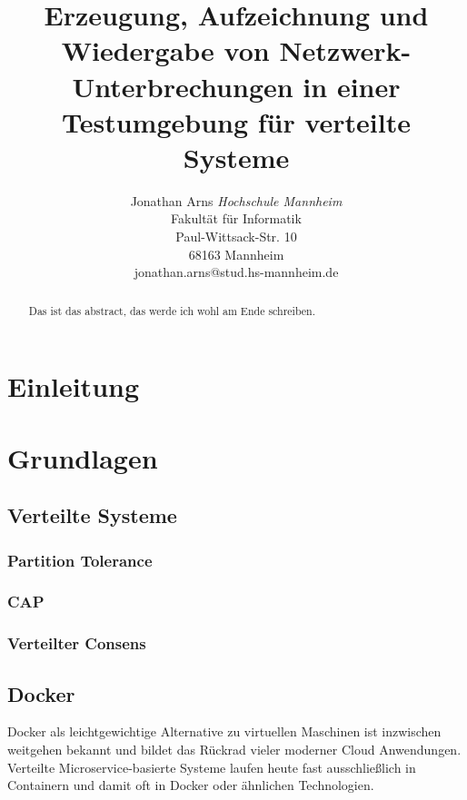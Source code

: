 \documentclass[a4paper]{report}
\begin{document}
\title{Erzeugung, Aufzeichnung und Wiedergabe von Netzwerk-Unterbrechungen in einer Testumgebung für verteilte Systeme}


\author{Jonathan Arns
	\textit{Hochschule Mannheim} \\
	Fakultät für Informatik\\
	Paul-Wittsack-Str. 10\\
	68163 Mannheim\\
	jonathan.arns@stud.hs-mannheim.de
}

\maketitle

\tableofcontents


\begin{abstract}
	Das ist das abstract, das werde ich wohl am Ende schreiben.
\end{abstract}


\chapter{Einleitung}

\chapter{Grundlagen}
\section{Verteilte Systeme}
\subsection{Partition Tolerance}
\subsection{CAP}
\subsection{Verteilter Consens}
\section{Docker}
Docker als leichtgewichtige Alternative zu virtuellen Maschinen ist inzwischen weitgehen bekannt und bildet das Rückrad vieler
moderner Cloud Anwendungen. Verteilte Microservice-basierte Systeme laufen heute fast ausschließlich in Containern und damit oft
in Docker oder ähnlichen Technologien.
\end{document}
